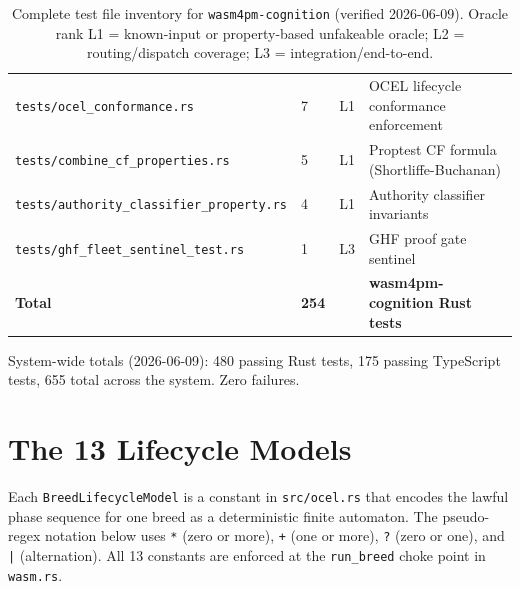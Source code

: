 \begin{table}[ht]
\begin{tabular}{llrl}
\texttt{tests/ocel\_conformance.rs}              &  7 & L1 & OCEL lifecycle conformance enforcement \\
\texttt{tests/combine\_cf\_properties.rs}        &  5 & L1 & Proptest CF formula (Shortliffe-Buchanan) \\
\texttt{tests/authority\_classifier\_property.rs}&  4 & L1 & Authority classifier invariants \\
\texttt{tests/ghf\_fleet\_sentinel\_test.rs}     &  1 & L3 & GHF proof gate sentinel \\
\hline
\textbf{Total}                                   & \textbf{254} & & \textbf{wasm4pm-cognition Rust tests} \\
\hline
\end{tabular}
\caption{Complete test file inventory for \texttt{wasm4pm-cognition} (verified 2026-06-09).
Oracle rank L1 = known-input or property-based unfakeable oracle;
L2 = routing/dispatch coverage;
L3 = integration/end-to-end.}
\label{tab:test-inventory}
\end{table}

\noindent
System-wide totals (2026-06-09): 480 passing Rust tests, 175 passing TypeScript tests,
655 total across the system. Zero failures.

\section{The 13 Lifecycle Models}
\label{app:lifecycle-models}

Each \texttt{BreedLifecycleModel} is a constant in \texttt{src/ocel.rs} that encodes the
lawful phase sequence for one breed as a deterministic finite automaton.
The pseudo-regex notation below uses \texttt{*} (zero or more), \texttt{+} (one or more),
\texttt{?} (zero or one), and \texttt{|} (alternation).
All 13 constants are enforced at the \texttt{run\_breed} choke point in \texttt{wasm.rs}.

